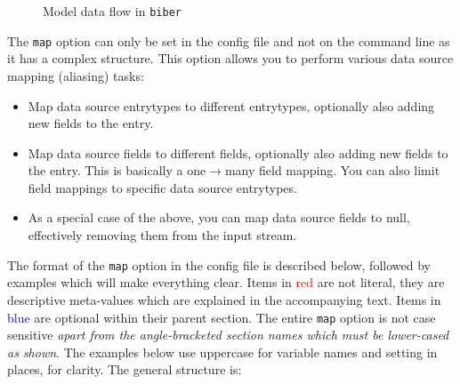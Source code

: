 \documentclass{ltxdockit}
\begin{document}
\begin{figure}[!htpb]
  \centering\small
  \caption{Model data flow in \texttt{biber}}
  \label{fig:biber-mdf}
\end{figure}

The \verb+map+ option can only be set in the config file
and not on the command line as it has a complex structure. This
option allows you to perform various data source mapping (aliasing)
tasks:

\begin{itemize}
\item Map data source entrytypes to different entrytypes,
  optionally also adding new fields to the entry.
\item Map data source fields to different fields,
  optionally also adding new fields to the entry. This is basically a
  one$\rightarrow$many field mapping. You can also limit field
  mappings to specific data source entrytypes.
\item As a special case of the above, you can map data source fields
  to null, effectively removing them from the input stream.
\end{itemize}

\noindent The format of the \verb+map+ option in the
config file is described below, followed by examples which will make
everything clear. Items in \textcolor{red}{red} are not
literal, they are descriptive meta-values which are explained in the
accompanying text. Items in \textcolor{blue}{blue} are optional within
their parent section. The entire \verb+map+ option is not case sensitive
\emph{apart from the angle-bracketed section names which must be
  lower-cased as shown}. The examples below use uppercase for variable names
and setting in places, for clarity. The general structure is:
\end{document}
